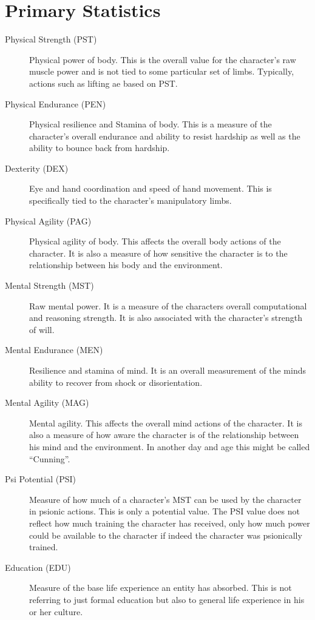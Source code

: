 \section{Primary Statistics}
\begin{description}
	\item[Physical Strength		(PST)]
	Physical power of body. This is the overall value for the character's
	raw muscle power and is not tied to some particular set of limbs. 
	Typically, actions such as lifting ae based on PST.
	\item[Physical Endurance		(PEN)]
	Physical resilience and Stamina of body. This is a measure of the
	character's overall endurance and ability to resist hardship as 
	well as the ability to bounce back from hardship.
	\item[Dexterity				(DEX)]
	Eye and hand coordination and speed of hand movement. This is
	specifically tied to the character's manipulatory limbs. 
	\item[Physical Agility		(PAG)]
	Physical agility of body. This affects the overall body actions of the
	character. It is also a measure of how sensitive the character is to
	the relationship between his body and the environment.
	\item[Mental Strength		(MST)]
	Raw mental power. It is a measure of the characters overall
	computational and reasoning strength. It is also associated with 
	the character's strength of will. 
	\item[Mental Endurance		(MEN)]
	Resilience and stamina of mind. It is an overall measurement of the
	minds ability to recover from shock or disorientation. 
	\item[Mental Agility			(MAG)]
	Mental agility. This affects the overall mind actions of the
	character. It is also a measure of how aware the character is of the
	relationship between his mind and the environment. In another day and
	age this might be called ``Cunning''.
	\item[Psi Potential	(PSI)]
	Measure of how much of a character's MST can be used by the 
	character in psionic actions. This is only a potential value.
	The PSI value does not reflect how much training the character 
	has received, only how much power could be available to the 
	character if indeed the character was psionically trained. 
	\item[Education	(EDU)]
	Measure of the base life experience an entity has absorbed. This 
	is not referring to just formal education but also to general
    life experience in his or her culture.
\end{description}

